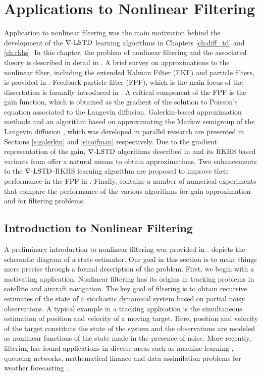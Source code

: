 \chapter{Applications to Nonlinear Filtering} 
\label{ch:filtering}
Application to nonlinear filtering was the main motivation behind the development of the $\nabla\text{-LSTD}$ learning algorithms in Chapters \ref{ch:diff_td} and \ref{ch:rkhs}. In this chapter, the problem of nonlinear filtering and the associated theory is described in detail in . A brief survey on approximations to the nonlinear filter, including the extended Kalman Filter (EKF) and particle filters, is provided in . Feedback particle filter (FPF), which is the main focus of the dissertation is formally introduced in . A critical component of the FPF is the gain function, which is obtained as the gradient of the solution to Poisson's equation associated to the Langevin diffusion. Galerkin-based approximation methods and an algorithm based on approximating the Markov semigroup of the Langevin diffusion \cite{tagmeh16a}, which was developed in parallel research are presented in Sections \ref{s:galerkin} and \ref{s:coifman} respectively. Due to the gradient representation of the gain, $\nabla\text{-LSTD}$ algorithms described in  and its RKHS based variants from  offer a natural means to obtain approximations. Two enhancements to the $\nabla\text{-LSTD}$-RKHS learning algorithm are proposed to improve their performance in the FPF in . Finally,  contains a number of numerical experiments that compare the performance of the various algorithms for gain approximation and for filtering problems.  
\section{Introduction to Nonlinear Filtering} 
\label{s:nl_filtering_intro}
A preliminary introduction to nonlinear filtering was provided in .   depicts the schematic diagram of a state estimator. Our goal in this section is to make things more precise through a formal description of the problem. First, we begin with a motivating application. Nonlinear filtering has its origins in tracking problems in satellite and aircraft navigation. The key goal of filtering is to obtain recursive estimates of the state of a stochastic dynamical system based on partial noisy observations. A typical example in a tracking application is the simultaneous estimation of position and velocity of a moving target. Here, position and velocity of the target constitute the state of the system and the observations are modeled as nonlinear functions of the state made in the presence of noise. More recently, filtering has found applications in diverse areas such as machine learning \cite{bishop06}, queueing networks, mathematical finance \cite{brihan08} and data assimilation problems for weather forecasting \cite{eve94}. 

